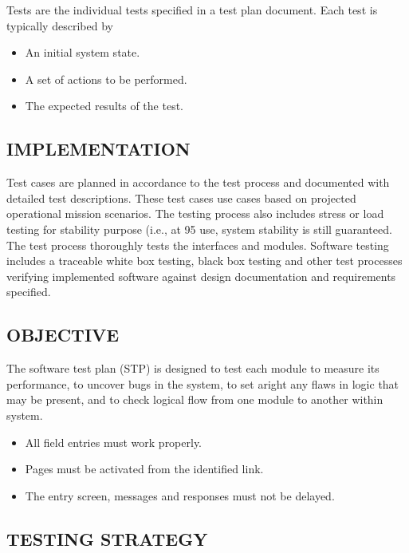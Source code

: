 \documentclass[12pt]{report}
\begin{document}
Tests are the individual tests specified in a test plan document. Each test is typically 
described by
\begin{itemize}
\item An initial system state.
\item A set of actions to be performed.
\item The expected results of the test.
\end{itemize}

\subsection{IMPLEMENTATION}
\justifying
\setlength{\parindent}{4em}
\setlength{\parskip}{0.5em}
\renewcommand{\baselinestretch}{1.5}
\normalsize

Test cases are planned in accordance to the test process and documented with detailed test 
descriptions. These test cases use cases based on projected operational mission scenarios. 
The testing process also includes stress or load testing for stability purpose (i.e., at 95%
use, system stability is still guaranteed. The test process thoroughly tests the interfaces and 
modules. Software testing includes a traceable white box testing, black box testing and other 
test processes verifying implemented software against design documentation and 
requirements specified.


\subsection{OBJECTIVE}
\justifying
\setlength{\parindent}{4em}
\setlength{\parskip}{0.5em}
\renewcommand{\baselinestretch}{1.5}
\normalsize

The software test plan (STP) is designed to test each module to measure its performance, to 
uncover bugs in the system, to set aright any flaws in logic that may be present, and to check 
logical flow from one module to another within system.
\begin{itemize}
\item All field entries must work properly.
\item Pages must be activated from the identified link.
\item The entry screen, messages and responses must not be delayed.

\end {itemize}


\subsection{TESTING STRATEGY}
\justifying
\setlength{\parindent}{4em}
\setlength{\parskip}{0.5em}
\renewcommand{\baselinestretch}{1.5}
\normalsize
\end{document}
